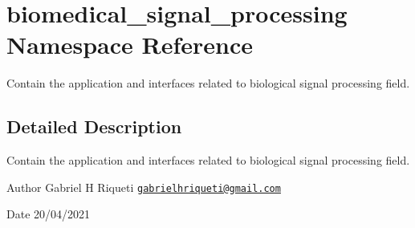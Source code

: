 \hypertarget{namespacebiomedical__signal__processing}{}\section{biomedical\+\_\+signal\+\_\+processing Namespace Reference}
\label{namespacebiomedical__signal__processing}


Contain the application and interfaces related to biological signal processing field.  




\subsection{Detailed Description}
Contain the application and interfaces related to biological signal processing field. 

\begin{DoxyAuthor}{Author}
Gabriel H Riqueti  \href{mailto:gabrielhriqueti@gmail.com}{\tt gabrielhriqueti@gmail.\+com} 
\end{DoxyAuthor}
\begin{DoxyDate}{Date}
20/04/2021 
\end{DoxyDate}
